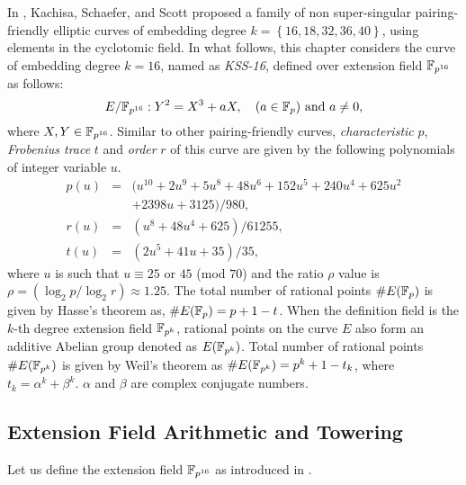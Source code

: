 In \cite{EPRINT:KacSchSco07}, Kachisa, Schaefer, and Scott proposed a family of non super-singular pairing-friendly elliptic curves of embedding degree $k = \left\lbrace16, 18, 32, 36, 40\right\rbrace$, using elements in the cyclotomic field. 
In what follows, this chapter considers  the curve of embedding degree $k =16$, named as \textit{KSS-16}, defined over extension field $\mathbb{F}_{p^{16}}$ as follows:
\begin{equation}\label{eq:KSS_16}
E/\mathbb{F}_{p^{16}}:Y^2=X^3+aX, \quad \mbox{($a \in {\mathbb{F}}_{p}$) and  $a \neq 0$},
\end{equation}
where $X,Y \in \mathbb{F}_{p^{16}}$. Similar to other pairing-friendly curves,  \textit{characteristic} $p$, \textit{Frobenius trace} $t$ and \textit{order} $r$ of this curve are given by the following polynomials of  integer variable $u$.
\begin{subequations}
	\begin{eqnarray}
	p(u) &= & (u^{10} +2u^9 +5u^8 +48u^6 +152u^5 +240u^4 +625u^2  \nonumber \\ 
	&& +2398u +3125)/980,  \\\label{eq:kss_16_char}
	r(u) &= & (u^8 +48u^4 +625)/61255, \label{eq:kss_16_degree}  \\
	t(u) &=& (2u^5 +41u+35)/35, \label{eq:kss_16_trace} 
	\end{eqnarray}
\end{subequations} 
where $u$ is such that $u \equiv 25$ or $45$ (mod $70$) and the ratio $\rho$ value is $\rho = (\log_2 p/\log_2 r) \approx 1.25$. 
The total number of rational points $\#E({\mathbb{F}}_{p})$ is given by Hasse's theorem as, $\#E({\mathbb{F}}_{p}) = p+1-t$. 
When the definition field is the $k$-th degree extension field $\mathbb{F}_{p^k}$, rational points on the curve $E$ also form an additive Abelian group denoted as $E(\mathbb{F}_{p^k})$. Total number of rational points $\#E(\mathbb{F}_{p^k})$ is given by  Weil's theorem \cite{weil1949numbers} as 
$\#E(\mathbb{F}_{p^k}) = p^k +1- t_k$, where $t_k =  \alpha^k + \beta^k$.  $\alpha$ and $\beta$ are  complex conjugate numbers.


\subsection{Extension Field Arithmetic and Towering}
\label{sec:ch:indo:ext_field_arith_ksss16}
Let us define the extension field $\mathbb{F}_{p^{16}}$ as introduced in .
